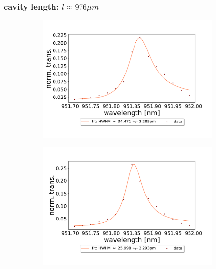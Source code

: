 \clearpage
\subsubsection*{cavity length: $l \approx 976 \mu m$}

\begin{figure}[h!]
    \centering
    \begin{subfigure}[b]{0.49\textwidth}
        \includegraphics[width=\textwidth]{figures/results/double fano fits/1000um_M3:M5_fit_1.pdf}
        \caption{}
        \label{fig:1000um_M3:M5_fit_1}
    \end{subfigure}
    \begin{subfigure}[b]{0.49\textwidth}
        \includegraphics[width=\textwidth]{figures/results/double fano fits/1000um_M3:M5_fit_2.pdf}
        \caption{}
        \label{fig:1000um_M3:M5_fit_2}

\end{subfigure}
\end{figure}
